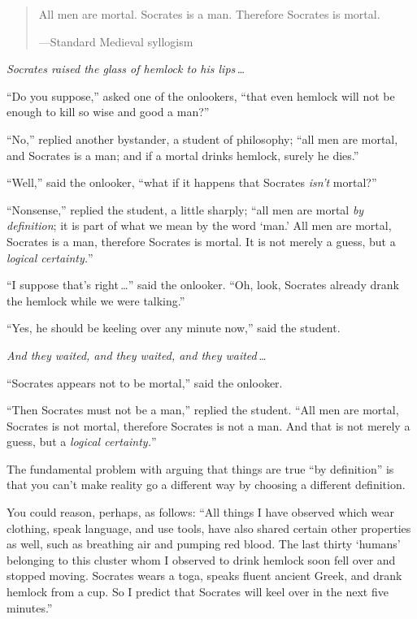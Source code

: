 {{\myendsectiontext


\bigskip


\begin{quote}
{
 All men are mortal. Socrates is a man. Therefore Socrates is
mortal.}

{\raggedleft
 {}---Standard Medieval syllogism
\par}
\end{quote}


{
 \textit{Socrates raised the glass of hemlock to his lips\,\ldots}}

{
 ``Do you suppose,'' asked one
of the onlookers, ``that even hemlock will not be
enough to kill so wise and good a man?''}

{
 ``No,'' replied another
bystander, a student of philosophy; ``all men are
mortal, and Socrates is a man; and if a mortal drinks hemlock, surely
he dies.''}

{
 ``Well,'' said the onlooker,
``what if it happens that Socrates
\textit{isn't} mortal?''}

{
 ``Nonsense,'' replied the
student, a little sharply; ``all men are mortal
\textit{by definition}; it is part of what we mean by the word
`man.' All men are mortal, Socrates is a
man, therefore Socrates is mortal. It is not merely a guess, but a
\textit{logical certainty.}''}

{
 ``I suppose that's right\,\ldots'' said the onlooker. ``Oh,
look, Socrates already drank the hemlock while we were
talking.''}

{
 ``Yes, he should be keeling over any minute
now,'' said the student.}

{
 \textit{And they waited, and they waited, and they waited\,\ldots}}

{
 ``Socrates appears not to be
mortal,'' said the onlooker.}

{
 ``Then Socrates must not be a
man,'' replied the student. ``All
men are mortal, Socrates is not mortal, therefore Socrates is not a
man. And that is not merely a guess, but a \textit{logical
certainty.}''}

{
 The fundamental problem with arguing that things are true
``by definition'' is that you
can't make reality go a different way by choosing a
different definition.}

{
 You could reason, perhaps, as follows: ``All
things I have observed which wear clothing, speak language, and use
tools, have also shared certain other properties as well, such as
breathing air and pumping red blood. The last thirty
`humans' belonging to this cluster whom
I observed to drink hemlock soon fell over and stopped moving. Socrates
wears a toga, speaks fluent ancient Greek, and drank hemlock from a
cup. So I predict that Socrates will keel over in the next five
minutes.''}

}}

